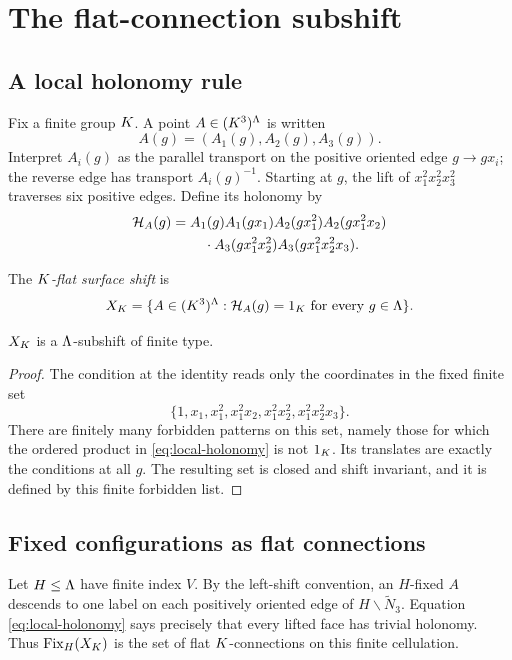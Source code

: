 \section{The flat-connection subshift}
\label{sec:flat-shift}

\subsection{A local holonomy rule}

Fix a finite group $K$.  A point $A\in(K^3)^{\Lambda}$ is written
\[
 A(g)=(A_1(g),A_2(g),A_3(g)).
\]
Interpret $A_i(g)$ as the parallel transport on the positive oriented edge
$g\to gx_i$; the reverse edge has transport $A_i(g)^{-1}$.  Starting at $g$,
the lift of $x_1^2x_2^2x_3^2$ traverses six positive edges.  Define its
holonomy by
\begin{align}
 \mathcal H_A(g)={}&A_1(g)A_1(gx_1)
 A_2(gx_1^2)A_2(gx_1^2x_2)\notag\\
 &\quad\cdot A_3(gx_1^2x_2^2)
 A_3(gx_1^2x_2^2x_3).
 \label{eq:local-holonomy}
\end{align}

\begin{definition}
\label{def:flat-shift}
The \emph{$K$-flat surface shift} is
\[
 X_{K}=\{A\in(K^3)^{\Lambda}:
              \mathcal H_A(g)=1_{K}\text{ for every }g\in\Lambda\}.
\]
\end{definition}

\begin{proposition}
\label{prop:sft}
$X_{K}$ is a $\Lambda$-subshift of finite type.
\end{proposition}

\begin{proof}
The condition at the identity reads only the coordinates in the fixed finite
set
\[
 \{1,x_1,x_1^2,x_1^2x_2,x_1^2x_2^2,
   x_1^2x_2^2x_3\}.
\]
There are finitely many forbidden patterns on this set, namely those for
which the ordered product in \eqref{eq:local-holonomy} is not $1_{K}$.  Its
translates are exactly the conditions at all $g$.  The resulting set is closed
and shift invariant, and it is defined by this finite forbidden list.
\end{proof}

\subsection{Fixed configurations as flat connections}

Let $H\leq\Lambda$ have finite index $V$.  By the left-shift convention,
an $H$-fixed $A$ descends to one label on each positively oriented edge of
$H\backslash\widetilde N_3$.  Equation \eqref{eq:local-holonomy} says precisely
that every lifted face has trivial holonomy.  Thus $\operatorname{Fix}_H(X_{K})$ is the set
of flat $K$-connections on this finite cellulation.

